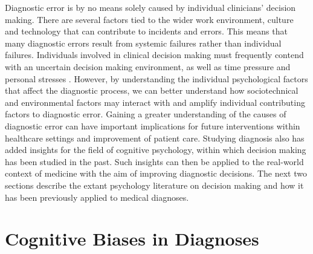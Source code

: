 \documentclass[a4paper, nobind]{templates/ociamthesis}
\begin{document}
\hfill\break
Diagnostic error is by no means solely caused by individual clinicians' decision making. There are several factors tied to the wider work environment, culture and technology that can contribute to incidents and errors. This means that many diagnostic errors result from systemic failures rather than individual failures. Individuals involved in clinical decision making must frequently contend with an uncertain decision making environment, as well as time pressure and personal stresses \autocite{yates_physician_2020}. However, by understanding the individual psychological factors that affect the diagnostic process, we can better understand how sociotechnical and environmental factors may interact with and amplify individual contributing factors to diagnostic error. Gaining a greater understanding of the causes of diagnostic error can have important implications for future interventions within healthcare settings and improvement of patient care. Studying diagnosis also has added insights for the field of cognitive psychology, within which decision making has been studied in the past. Such insights can then be applied to the real-world context of medicine with the aim of improving diagnostic decisions. The next two sections describe the extant psychology literature on decision making and how it has been previously applied to medical diagnoses.

\section{Cognitive Biases in Diagnoses}\label{cognitive-biases-in-diagnoses}
\end{document}
